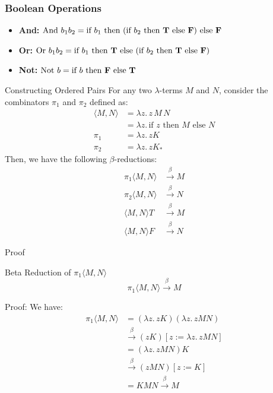 \documentclass{beamer}
\begin{document}
\begin{frame}
  \frametitle{Boolean Operations}
  \begin{itemize}
    \item \textbf{And:} \(\text{And }b_1b_2 = \text{if }b_1 \text{ then (if }b_2 \text{ then \textbf{T} else \textbf{F}) else \textbf{F}}\)
    \item \textbf{Or:  } \(\text{Or }b_1b_2 = \text{if }b_1 \text{ then \textbf{T} else (if }b_2 \text{ then \textbf{T} else \textbf{F})}\)
    \item \textbf{Not:} \(\text{Not }b = \text{if }b \text{ then \textbf{F} else \textbf{T}}\)
  \end{itemize}
\end{frame}


\begin{frame}{Constructing Ordered Pairs}
  For any two \( \lambda \)-terms \( M \) and \( N \), consider the combinators \( \pi_1 \) and \( \pi_2 \) defined as:
  \begin{align*}
    \langle M, N \rangle &= \lambda z.\, z\, M\, N \\
    &= \lambda z.\, \text{if } z \text{ then } M \text{ else } N \\
    \pi_1 &= \lambda z.\, zK \\
    \pi_2 &= \lambda z.\, zK_*
  \end{align*}
  Then, we have the following \(\beta\)-reductions:
  \begin{align*}
    \pi_1 \langle M, N \rangle &\xrightarrow{\beta} M \\
    \pi_2 \langle M, N \rangle &\xrightarrow{\beta} N \\
    \langle M, N \rangle T &\xrightarrow{\beta} M \\
    \langle M, N \rangle F &\xrightarrow{\beta} N
  \end{align*}
\end{frame}
\begin{frame}{Proof}
  \begin{block}{Beta Reduction of \(\pi_1 \langle M, N \rangle\)}
    \[
      \pi_1 \langle M, N \rangle \xrightarrow{\beta} M
    \]
  \end{block}
  Proof:  
  We have:
  \begin{align*}
    \pi_1 \langle M, N \rangle &= (\lambda z.\, zK)(\lambda z.\, z M N) \\
    &\xrightarrow{\beta} (zK)[z := \lambda z.\, z M N] \\
    &= (\lambda z.\, z M N)K \\
    &\xrightarrow{\beta} (z M N)[z := K] \\
    &= K M N \xrightarrow{\beta} M
  \end{align*}
\end{frame}
\end{document}
